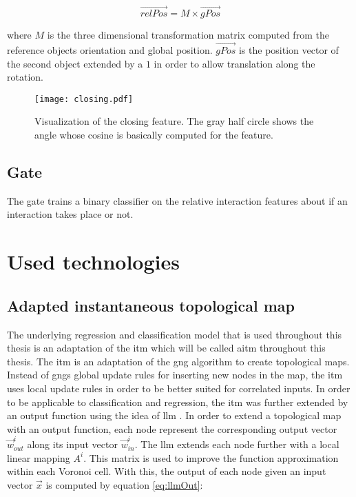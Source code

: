 \begin{equation}
	\vec{relPos} = M \times \vec{gPos}
\label{eq:trans}
\end{equation}

where $M$ is the three dimensional transformation matrix computed from the reference objects orientation and global position. $\vec{gPos}$ is the position vector of the second object extended by a $1$ in order to allow translation along the rotation. 

\begin{figure}
	\centering
	\texttt{[image: closing.pdf]}
	\caption{Visualization of the closing feature. The gray half circle shows the angle whose cosine is basically computed for the feature.} 
	\label{fig:closing}
\end{figure}

\subsection{Gate}

The gate trains a binary classifier on the relative interaction features about if an interaction takes place or not. 



\section{Used technologies \label{sec:technologies}}

\subsection{Adapted instantaneous topological map \label{sec:ITM}}
The underlying regression and classification model that is used throughout this thesis is an adaptation of the \acrfull{itm} which will be called \acrfull{aitm} throughout this thesis.
The \gls{itm} \cite{itm} is an adaptation of the \gls{gng} \cite{gng} algorithm to create topological maps. Instead of \glspl{gng} global update rules for inserting new nodes in the map, the \gls{itm} uses local update rules in order to be better suited for correlated inputs. 
In order to be applicable to classification and regression, the \gls{itm} was further extended by an output function using the idea of \gls{llm} \cite{LLM}. In order to extend a topological map with an output function, each node represent the corresponding output vector $\vec{w}^i_{out}$ along its input vector $\vec{w}^i_{in}$. The \gls{llm} extends each node further with a local linear mapping $A^i$. This matrix is used to improve the function approximation within each Voronoi cell. With this, the output of each node given an input vector $\vec{x}$ is computed by equation \ref{eq:llmOut}:

